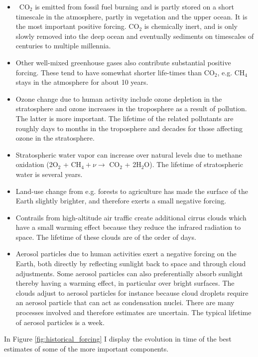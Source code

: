 \documentclass[12pt]{book}
\begin{document}
\begin{itemize}
\itemsep0em
\item CO$_2$ is emitted from fossil fuel burning and is partly stored on a short timescale in the atmosphere, partly in vegetation and the upper ocean. It is the most important positive forcing. CO$_2$ is chemically inert, and is only slowly removed into the deep ocean and eventually sediments on timescales of centuries to multiple millennia. 
\item Other well-mixed greenhouse gases also contribute substantial positive forcing. These tend to have somewhat shorter life-times than CO$_2$, e.g. CH$_4$ stays in the atmosphere for about 10 years. 
\item Ozone change due to human activity include ozone depletion in the stratosphere and ozone increases in the troposphere as a result of pollution. The latter is more important. The lifetime of the related pollutants are roughly days to months in the troposphere and decades for those affecting ozone in the stratosphere.
\item Stratospheric water vapor can increase over natural levels due to methane oxidation (2O$_2$ + CH$_4 + \nu \rightarrow $ CO$_2$ + 2H$_2$O). The lifetime of stratospheric water is several years.
\item Land-use change from e.g. forests to agriculture has made the surface of the Earth slightly brighter, and therefore exerts a small negative forcing.
\item Contrails from high-altitude air traffic create additional cirrus clouds which have a small warming effect because they reduce the infrared radiation to space. The lifetime of these clouds are of the order of days.
\item Aerosol particles due to human activities exert a negative forcing on the Earth, both directly by reflecting sunlight back to space and through cloud adjustments. Some aerosol particles can also preferentially absorb sunlight thereby having a warming effect, in particular over bright surfaces. The clouds adjust to aerosol particles for instance because cloud droplets require an aerosol particle that can act as condensation nuclei. There are many processes involved and therefore estimates are uncertain. The typical lifetime of aerosol particles is a week.
\end{itemize}
In Figure \ref{fig:historical_forcing} I display the evolution in time of the best estimates of some of the more important components.
\end{document}
